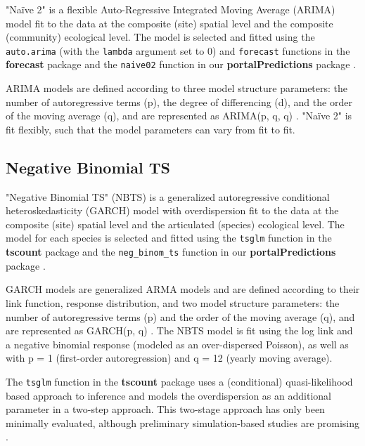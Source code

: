 \documentclass{article}
\def\code#1{\texttt{#1}}
\begin{document}
"Na\"{i}ve 2" is a flexible Auto-Regressive Integrated Moving Average (ARIMA) model fit to the data at the composite (site) spatial level and the composite (community) ecological level. The model is selected and fitted using the \code{auto.arima} (with the \code{lambda} argument set to 0) and \code{forecast} functions in the \textbf{forecast} package \citep{Hyndman2013, Hyndman2017} and the \code{naive02} function in our \textbf{portalPredictions} package \citep{PortalPredictions}.

ARIMA models are defined according to three model structure parameters: the number of autoregressive terms (p), the degree of differencing (d), and the order of the moving average (q), and are represented as ARIMA(p, q, q) \citep{Box1970}. "Na\"{i}ve 2" is fit flexibly, such that the model parameters can vary from fit to fit.

\subsection{Negative Binomial TS}
\label{subsec:currmods_nbts}

"Negative Binomial TS" (NBTS) is a generalized autoregressive conditional heteroskedasticity (GARCH) model with overdispersion fit to the data at the composite (site) spatial level and the articulated (species) ecological level. The model for each species is selected and fitted using the \code{tsglm} function in the \textbf{tscount} package \citep{Liboschik2017a} and the \code{neg\_binom\_ts} function in our \textbf{portalPredictions} package \citep{PortalPredictions}.

GARCH models are generalized ARMA models and are defined according to their link function, response distribution, and two model structure parameters: the number of autoregressive terms (p) and the order of the moving average (q), and are represented as GARCH(p, q) \citep{Liboschik2017a}. The NBTS model is fit using the log link and a negative binomial response (modeled as an over-dispersed Poisson), as well as with p = 1 (first-order autoregression) and q = 12 (yearly moving average).

The \code{tsglm} function in the \textbf{tscount} package \citep{Liboschik2017a} uses a (conditional) quasi-likelihood based approach to inference and models the overdispersion as an additional parameter in a two-step approach. This two-stage approach has only been minimally evaluated, although preliminary simulation-based studies are promising \citep{Liboschik2017b}.    
\end{document}
